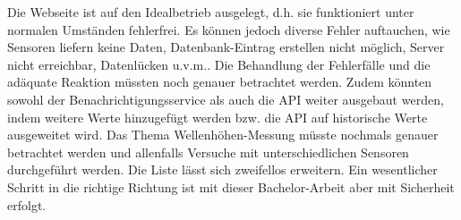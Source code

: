 

Die Webseite ist auf den Idealbetrieb ausgelegt, d.h. sie funktioniert unter normalen Umständen fehlerfrei. Es können jedoch diverse Fehler auftauchen, wie Sensoren liefern keine Daten, Datenbank-Eintrag erstellen nicht möglich, Server nicht erreichbar, Datenlücken u.v.m.. Die Behandlung der Fehlerfälle und die adäquate Reaktion müssten noch genauer betrachtet werden. Zudem könnten sowohl der Benachrichtigungsservice als auch die API weiter ausgebaut werden, indem weitere Werte hinzugefügt werden bzw. die API auf historische Werte ausgeweitet wird. Das Thema Wellenhöhen-Messung müsste nochmals genauer betrachtet werden und allenfalls Versuche mit unterschiedlichen Sensoren durchgeführt werden.
Die Liste lässt sich zweifellos erweitern. Ein wesentlicher Schritt in die richtige Richtung ist mit dieser Bachelor-Arbeit aber mit Sicherheit erfolgt.
